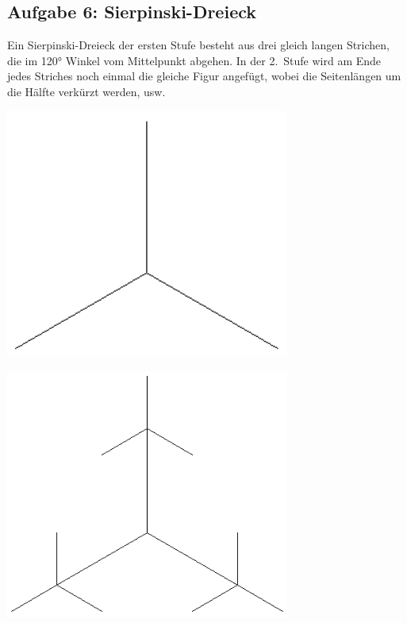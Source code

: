 \subsection{Aufgabe 6: Sierpinski-Dreieck}
 
Ein Sierpinski-Dreieck der ersten Stufe besteht aus drei gleich langen
Strichen, die im 120° Winkel vom Mittelpunkt abgehen. In der 2.~Stufe wird am
Ende jedes Striches noch einmal die gleiche Figur angefügt, wobei die
Seitenlängen um die Hälfte verkürzt werden, usw.

\begin{minipage}{0.3\textwidth}
  \centering
  \includegraphics[width=0.7\textwidth]{./inf/SEKII/06_Java_Rekursion/Aufgabe3_6-1.png}
\end{minipage}\hfill
\begin{minipage}{0.3\textwidth}
  \centering
  \includegraphics[width=0.7\textwidth]{./inf/SEKII/06_Java_Rekursion/Aufgabe3_6-2.png}
\end{minipage}

